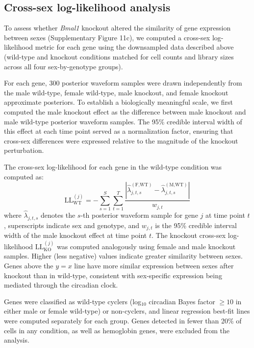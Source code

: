\documentclass[12pt]{article}
\begin{document}
\subsection*{Cross-sex log-likelihood analysis}

To assess whether \textit{Bmal1} knockout altered the similarity of gene expression between sexes
(Supplementary Figure 11c), we computed a cross-sex log-likelihood metric for each gene
using the downsampled data described above (wild-type and knockout conditions matched for cell
counts and library sizes across all four sex-by-genotype groups).

For each gene, 300 posterior waveform samples were drawn independently from the male wild-type,
female wild-type, male knockout, and female knockout approximate posteriors. To establish a
biologically meaningful scale, we first computed the male knockout effect as the difference between
male knockout and male wild-type posterior waveform samples. The 95\% credible interval width of
this effect at each time point served as a normalization factor, ensuring that cross-sex differences
were expressed relative to the magnitude of the knockout perturbation.

The cross-sex log-likelihood for each gene in the wild-type condition was computed as:
\begin{equation}
\text{LL}_{\text{WT}}^{(j)} = -\sum_{s=1}^{S} \sum_{t=1}^{T}
\frac{\left| \hat{\lambda}_{j,t,s}^{(\text{F,WT})} - \hat{\lambda}_{j,t,s}^{(\text{M,WT})} \right|}
{w_{j,t}}
\end{equation}
where $\hat{\lambda}_{j,t,s}$ denotes the $s$-th posterior waveform sample for gene $j$ at time
point $t$, superscripts indicate sex and genotype, and $w_{j,t}$ is the 95\% credible interval
width of the male knockout effect at time point $t$. The knockout cross-sex log-likelihood
$\text{LL}_{\text{KO}}^{(j)}$ was computed analogously using female and male knockout samples.
Higher (less negative) values indicate greater similarity between sexes. Genes above the $y = x$
line have more similar expression between sexes after knockout than in wild-type, consistent with
sex-specific expression being mediated through the circadian clock.

Genes were classified as wild-type cyclers (log$_{10}$ circadian Bayes factor $\geq 10$ in either
male or female wild-type) or non-cyclers, and linear regression best-fit lines were computed
separately for each group. Genes detected in fewer than 20\% of cells in any condition, as well as
hemoglobin genes, were excluded from the analysis.
\end{document}
